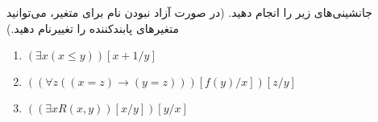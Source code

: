 جانشینی‌های زیر را انجام دهید. (در صورت آزاد نبودن نام برای متغیر، می‌توانید متغیرهای پابندکننده را تغییرنام دهید.)
\begin{enumerate}[label=(\alph*)]
  \item $(\exists x (x \leq y))[x+1/y]$
  \item $((\forall z ((x = z) \rightarrow (y = z)))[f(y)/x])[z/y]$
  \item $((\exists x R(x, y))[x/y])[y/x]$
\end{enumerate}
